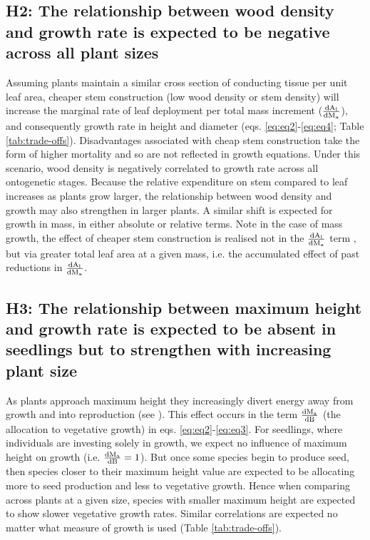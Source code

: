 \documentclass[a4paper,11pt]{article}
\begin{document}
\subsection*{H2: The relationship between wood density and growth rate is expected to be negative across all plant sizes}

Assuming plants maintain a similar cross section of conducting tissue per unit leaf area, cheaper stem construction (low wood density or stem density) will increase the marginal rate of leaf deployment per total mass increment ($\frac{\rm{d} A_{\rm l}}{\rm{d} M_{\rm a} }$), and consequently growth rate in height and diameter (eqs. \ref{eq:eq2}-\ref{eq:eq4}; Table \ref{tab:trade-offs}). Disadvantages associated with cheap stem construction take the form of higher mortality and so are not reflected in growth equations. Under this scenario, wood density is negatively correlated to growth rate across all ontogenetic stages. Because the relative expenditure on stem compared to leaf increases as plants grow larger, the relationship between wood density and growth may also strengthen in larger plants. A similar shift is expected for growth in mass, in either absolute or relative terms. Note in the case of mass growth, the effect of cheaper stem construction is realised not in the $\frac{\rm{d} A_{\rm l}}{\rm{d} M_{\rm a} }$ term , but via greater total leaf area at a given mass, i.e. the accumulated effect of past reductions in  $\frac{\rm{d} A_{\rm l}}{\rm{d} M_{\rm a} }$.

\subsection*{H3: The relationship between maximum height and growth rate is expected to be absent in seedlings but to strengthen with increasing plant size}

As plants approach maximum height they increasingly divert energy away from growth and into reproduction (see \citealt{Thomas:1996do,Thomas-2011, Wenk:2015jz}). This effect occurs in the term $\frac{\rm{d} M_{\rm a} }{\rm{d} B}$ (the allocation to vegetative growth) in eqs. \ref{eq:eq2}-\ref{eq:eq3}. For seedlings, where individuals are investing solely in growth, we expect no influence of maximum height on growth (i.e. $\frac{\rm{d} M_{\rm a} }{\rm{d} B} =1$). But once some species begin to produce seed, then species closer to their maximum height value are expected to be allocating more to seed production and less to vegetative growth. Hence when comparing across plants at a given size, species with smaller maximum height are expected to show slower vegetative growth rates. Similar correlations are expected no matter what measure of growth is used (Table \ref{tab:trade-offs}).
\end{document}
